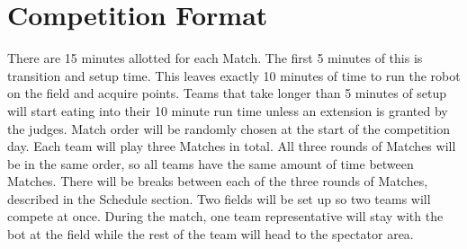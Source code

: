 \section{Competition Format}

There are 15 minutes allotted for each Match. The first 5 minutes of this is transition and setup time. This leaves exactly 10 minutes of time to run the robot on the field and acquire points. Teams that take longer than 5 minutes of setup will start eating into their 10 minute run time unless an extension is granted by the judges. Match order will be randomly chosen at the start of the competition day. Each team will play three Matches in total. All three rounds of Matches will be in the same order, so all teams have the same amount of time between Matches. There will be breaks between each of the three rounds of Matches, described in the Schedule section. Two fields will be set up so two teams will compete at once. During the match, one team representative will stay with the bot at the field while the rest of the team will head to the spectator area.

